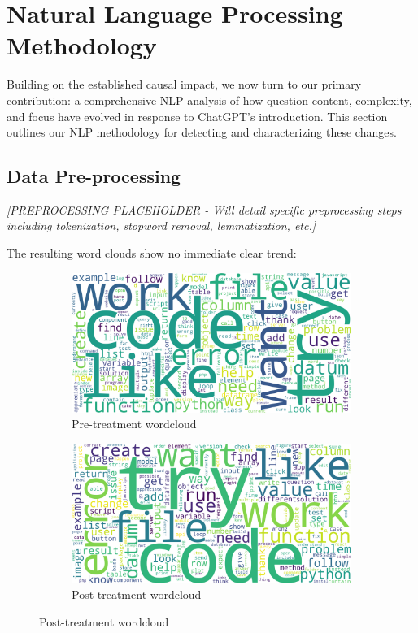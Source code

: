\section{Natural Language Processing Methodology}
\label{sec:nlp_methodology}

Building on the established causal impact, we now turn to our primary contribution: a comprehensive NLP analysis of how question content, complexity, and focus have evolved in response to ChatGPT's introduction. This section outlines our NLP methodology for detecting and characterizing these changes.


\subsection{Data Pre-processing}
\textit{[PREPROCESSING PLACEHOLDER - Will detail specific preprocessing steps including tokenization, stopword removal, lemmatization, etc.]}

The resulting word clouds show no immediate clear trend:

\begin{figure}[H]
    \centering
    \begin{subfigure}[b]{0.475\textwidth}
        \centering
        \includegraphics[width=1\linewidth]{imgs/wordclouds/wc_stackoverflow_pre_alphanum.png}
        \caption{Pre-treatment wordcloud}
        \label{fig:prewc}
    \end{subfigure}
    \hfill
    \begin{subfigure}[b]{0.475\textwidth}
        \centering
        \includegraphics[width=1\linewidth]{imgs/wordclouds/wc_stackoverflow_post_alphanum.png}
        \caption{Post-treatment wordcloud}
        \label{fig:postwc}
    \end{subfigure}
\end{figure}

